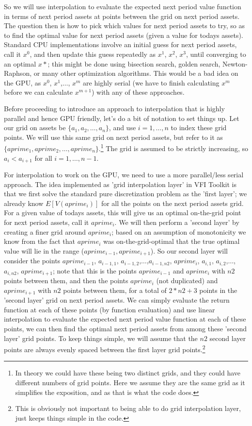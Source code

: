 \documentclass[11pt,fleqn]{article}
\begin{document}
So we will use interpolation to evaluate the expected next period value function in terms of next period assets at points between the grid on next period assets. The question then is how to pick which values for next period assets to try, so as to find the optimal value for next period assets (given a value for todays assets). Standard CPU implementations involve an initial guess for next period assets, call it $x^0$, and then update this guess repeatedly as $x^1$, $x^2$, $x^3$, until converging to an optimal $x*$; this might be done using bisection search, golden search, Newton-Raphson, or many other optimization algorithms. This would be a bad idea on the GPU, as $x^0$, $x^1$,$\dots$, $x^m$ are highly serial (we have to finish calculating $x^m$ before we can calculate $x^{m+1}$) with any of these approaches.

Before proceeding to introduce an approach to interpolation that is highly parallel and hence GPU friendly, let's do a bit of notation to set things up. Let our grid on assets be $\{a_1,a_2,\dots,a_n\}$, and use $i=1,\dots,n$ to index these grid points. We will use this same grid on next period assets, but refer to it as $\{aprime_1,aprime_2,\dots,aprime_n\}$.\footnote{In theory we could have these being two distinct grids, and they could have different numbers of grid points. Here we assume they are the same grid as it simplifies the exposition, and as that is what the code does.} The grid is assumed to be strictly increasing, so $a_i<a_{i+1}$ for all $i=1,\dots,n-1$.

For interpolation to work on the GPU, we need to use a more parallel/less serial approach. The idea implemented as 'grid interpolation layer' in VFI Toolkit is that we first solve the standard pure discretization problem as the 'first layer'; we already know $E[V(aprime_i)]$ for all the points on the next period assets grid. For a given value of todays assets, this will give us an optimal on-the-grid point for next period assets, call it $aprime_i$. We will then perform a 'second layer' by creating a finer grid around $aprime_i$; based on an assumption of monotonicity we know from the fact that $aprime_i$ was on-the-grid-optimal that the true optimal value will lie in the range ($aprime_{i-1},aprime_{i+1}$). So our second layer will consider the points $aprime_{i-1}$, $a_{i-1,1}$, $a_{i-1,2}$,$\dots$,$a_{i-1,n2}$, $aprime_i$, $a_{i,1}$, $a_{i,2}$,$\dots$,$a_{i,n2}$, $aprime_{i+1}$; note that this is the points $aprime_{i-1}$ and $aprime_i$ with $n2$ points between them, and then the points $aprime_i$ (not duplicated) and $aprime_{i+1}$ with $n2$ points between them, for a total of $2*n2+3$ points in the 'second layer' grid on next period assets. We can simply evaluate the return function at each of these points (by function evaluation) and use linear interpolation to evaluate the expected next period value function at each of these points, we can then find the optimal next period assets from among these 'second layer' grid points. To keep things simple, we will assume that the $n2$ second layer points are always evenly spaced between the first layer grid points.\footnote{This is obviously not important to being able to do grid interpolation layer, just keeps things simple in the code.}
\end{document}
